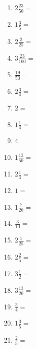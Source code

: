 \documentclass[12pt]{article}
\begin{document}
\begin{enumerate}
\item \large $ 2 \frac{23}{50} = $ \vspace{1.5cm}
\newpage
\item \large $ 1 \frac{3}{5} = $ \vspace{1.5cm}
\item \large $ 2 \frac{2}{25} = $ \vspace{1.5cm}
\item \large $ 3 \frac{23}{100} = $ \vspace{1.5cm}
\item \large $ \frac{19}{50} = $ \vspace{1.5cm}
\item \large $ 2 \frac{3}{4} = $ \vspace{1.5cm}
\item \large $ 2 = $ \vspace{1.5cm}
\item \large $ 1 \frac{1}{4} = $ \vspace{1.5cm}
\item \large $ 4 = $ \vspace{1.5cm}
\item \large $ 1 \frac{13}{50} = $ \vspace{1.5cm}
\item \large $ 2 \frac{1}{4} = $ \vspace{1.5cm}
\newpage
\item \large $ 1 = $ \vspace{1.5cm}
\item \large $ 1 \frac{7}{20} = $ \vspace{1.5cm}
\item \large $ \frac{3}{10} = $ \vspace{1.5cm}
\item \large $ 2 \frac{1}{25} = $ \vspace{1.5cm}
\item \large $ 2 \frac{2}{5} = $ \vspace{1.5cm}
\item \large $ 3 \frac{1}{2} = $ \vspace{1.5cm}
\item \large $ 3 \frac{13}{20} = $ \vspace{1.5cm}
\item \large $ \frac{3}{4} = $ \vspace{1.5cm}
\item \large $ 1 \frac{3}{5} = $ \vspace{1.5cm}
\item \large $ \frac{2}{5} = $ \vspace{1.5cm}

\end{enumerate}
\end{document}
